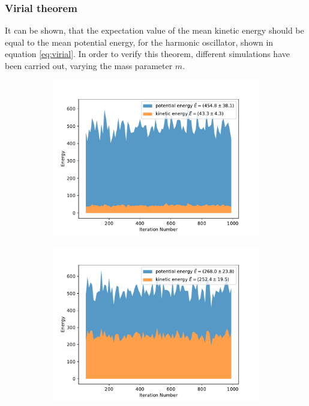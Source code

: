 \documentclass{scrartcl}
\begin{document}
	\subsubsection{Virial theorem}
		It can be shown, that the expectation value of the mean kinetic energy should be equal to the mean potential energy, for the harmonic oscillator, shown in equation \ref{eq:virial}.
		In order to verify this theorem, different simulations have been carried out, varying the mass parameter $m$.
		\begin{figure}[H]
			\centering
				\begin{subfigure}[c]{0.32\textwidth}
					\includegraphics[width=\textwidth]{../imgs/harmonic_oscillator_track/track_1000100_light_virial.pdf}
					\label{fig:track_1000100_light_virial}
				\end{subfigure}
				\begin{subfigure}[c]{0.32\textwidth}
					\includegraphics[width=\textwidth]{../imgs/harmonic_oscillator_track/track_1000100_working_virial.pdf}

\end{subfigure}
\end{figure}
\end{document}

